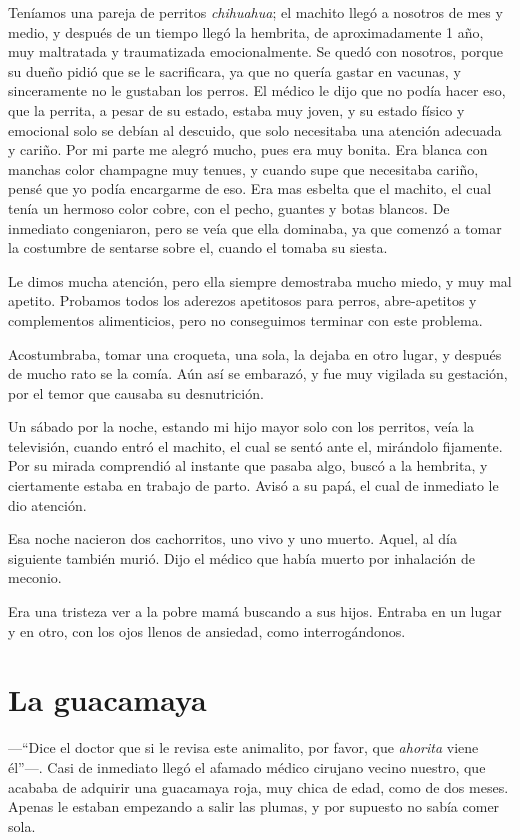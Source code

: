 \documentclass[letterpaper, 12pt]{book}
\begin{document}
Teníamos una pareja de perritos \textit{chihuahua}; el machito llegó a nosotros de mes y medio, y después de un tiempo llegó la hembrita, de aproximadamente 1 año, muy maltratada y traumatizada emocionalmente. Se quedó con nosotros, porque su dueño pidió que se le sacrificara, ya que no quería gastar en vacunas, y sinceramente no le gustaban los perros. El médico le dijo que no podía hacer eso, que la perrita, a pesar de su estado, estaba muy joven, y su estado físico y emocional solo se debían al descuido, que solo necesitaba una atención adecuada y cariño. Por mi parte me alegró mucho, pues era muy bonita. Era blanca con manchas color champagne muy tenues, y cuando supe que necesitaba cariño, pensé que yo podía encargarme de eso. Era mas esbelta que el machito, el cual tenía un hermoso color cobre, con el pecho, guantes y botas blancos. De inmediato congeniaron, pero se veía que ella dominaba, ya que comenzó a tomar la costumbre de sentarse sobre el, cuando el tomaba su siesta. 

Le dimos mucha atención, pero ella siempre demostraba mucho miedo, y muy mal apetito. Probamos todos los aderezos apetitosos para perros, abre-apetitos y complementos alimenticios, pero no conseguimos terminar con este problema. 

Acostumbraba, tomar una croqueta, una sola, la dejaba en otro lugar, y después de mucho rato se la comía. Aún así se embarazó, y fue muy vigilada su gestación, por el temor que causaba su desnutrición.

Un sábado por la noche, estando mi hijo mayor solo con los perritos, veía la televisión, cuando entró el machito, el cual se sentó ante el, mirándolo fijamente. Por su mirada comprendió al instante que pasaba algo, buscó a la hembrita, y ciertamente estaba en trabajo de parto. Avisó a su papá, el cual de inmediato le dio atención. 

Esa noche nacieron dos cachorritos, uno vivo y uno muerto. Aquel, al día siguiente también murió. Dijo el médico que había muerto por inhalación de meconio. 

Era una tristeza ver a la pobre mamá buscando a sus hijos. Entraba en un lugar y en otro, con los ojos llenos de ansiedad, como interrogándonos.

\chapter{La guacamaya}

---``Dice el doctor que si le revisa este animalito, por favor, que \textit{ahorita} viene él''---. Casi de inmediato llegó el afamado médico cirujano vecino nuestro, que acababa de adquirir una guacamaya roja, muy chica de edad, como de dos meses. Apenas le estaban empezando a salir las plumas, y por supuesto no sabía comer sola. 
\end{document}
